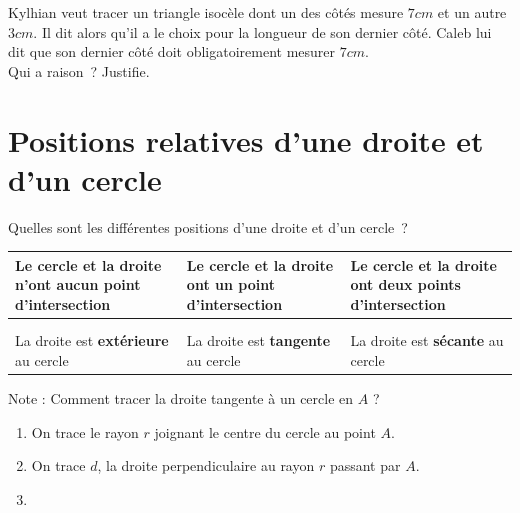 \documentclass[../math2.tex]{subfiles}
\begin{document}
\begin{exercise}
  Kylhian veut tracer un triangle isocèle dont un des côtés mesure $7cm$ et un autre $3cm$. Il dit alors qu'il a le choix pour la longueur de son dernier côté. Caleb lui dit que son dernier côté doit obligatoirement mesurer $7cm$. \\
  Qui a raison~? Justifie.
  \vspace*{4cm}
\end{exercise}

\section{Positions relatives d'une droite et d'un cercle}

Quelles sont les différentes positions d'une droite et d'un cercle~? \\

\tikzexternaldisable
\begin{tabularx}{\linewidth}{|Y|Y|Y|}
  \hline
  Le cercle et la droite n'ont aucun point d'intersection & Le cercle et la droite ont un point d'intersection & Le cercle et la droite ont deux points d'intersection \\
  \hline
                                                          &                                                    &                                                       \\
                        &                  &                     \\
  \hline
  La droite est \textbf{extérieure} au cercle             & La droite est \textbf{tangente} au cercle          & La droite est \textbf{sécante} au cercle              \\
  \hline
\end{tabularx}
\tikzexternalenable

Note : Comment tracer la droite tangente à un cercle en $A$ ?
\begin{enumerate}[label=\arabic*, cols=2]
  \item On trace le rayon $r$ joignant le centre du cercle au point $A$.
  \item On trace $d$, la droite perpendiculaire au rayon $r$ passant par $A$.
  \item [\label=] 
\end{enumerate}
\end{document}
